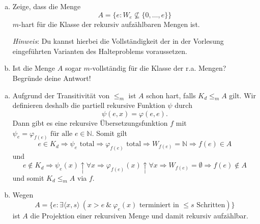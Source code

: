 \documentclass[german,headsepline]{scrartcl}
\begin{document}
	\begin{question}[subtitle={Klausur 2009}]
		\begin{enumerate}[(a)]
			\item Zeige, dass die Menge
				\[A=\{e\colon W_e\not\subseteq\{0,\dots,e\}\}\]
				$m$-hart für die Klasse der rekursiv aufzählbaren Mengen ist.
				
				\textit{Hinweis}: Du kannst hierbei die Vollständigkeit
				der in der Vorlesung eingeführten Varianten des Halteproblems voraussetzen.
			\item Ist die Menge $A$ sogar $m$-vollständig für die Klasse der r.a. Mengen?
				Begründe deine Antwort!
		\end{enumerate}
	\end{question}
	\begin{solution}
		\begin{enumerate}[(a)]
			\item Aufgrund der Transitivität von $\leq_m$ ist $A$ schon hart, falls $K_d\leq_mA$ gilt.
				Wir definieren deshalb die partiell rekursive Funktion $\psi$ durch
				\[\psi(e,x)=\varphi(e,e).\]
				Dann gibt es eine rekursive Übersetzungsfunktion $f$ mit
				$\psi_e=\varphi_{f(e)}\text{ für alle }e\in\mathbb{N}$.
				Somit gilt
				\[e\in K_d\Rightarrow\psi_e\text{ total}\Rightarrow\varphi_{f(e)}\text{ total}
				\Rightarrow W_{f(e)}=\mathbb{N}\Rightarrow f(e)\in A\]
				und
				\[e\notin K_d\Rightarrow\psi_e(x)\uparrow\forall x\Rightarrow\varphi_{f(e)}(x)\uparrow\forall x
				\Rightarrow W_{f(e)}=\emptyset\Rightarrow f(e)\notin A\]
				und somit $K_d\leq_mA$ via $f$.
			\item Wegen
				\[A=\{e\colon\exists\langle x,s\rangle~(x>e~\&~\varphi_e(x)\text{ terminiert in $\leq s$ Schritten})\}\]
				ist $A$ die Projektion einer rekursiven Menge und damit rekursiv aufzählbar.
		\end{enumerate}
	\end{solution}
	
\end{document}
